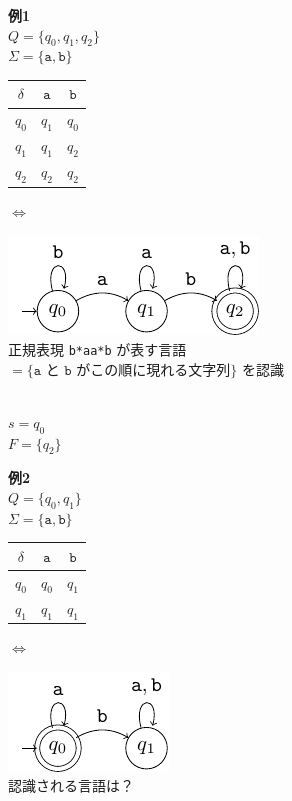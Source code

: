 \documentclass[main]{subfiles}
\begin{document}
\begin{tcolorbox}[
  enhanced,
  coltitle=black,
  attach boxed title to top left={xshift=3mm, yshift=-\tcboxedtitleheight/2},
  colback=white,
  title=DFA の例:,
  boxed title style={size=small,colframe=white,colback=white}
]
\small
\textbf{例1}\\
$Q = \{q_0, q_1, q_2\}$\\
$\Sigma = \{\mathtt{a,b}\}$\\[-14pt]
\begin{tabular}{c|cc}
$\delta$ & $\mathtt{a}$ & $\mathtt{b}$ \\
\hline
$q_0$ & $q_1$ & $q_0$ \\
$q_1$ & $q_1$ & $q_2$ \\
$q_2$ & $q_2$ & $q_2$ \\
\end{tabular}
\hspace{5mm} $\Leftrightarrow$
\begin{minipage}{0.45\textwidth}
  \includegraphics{figures/dfa1.pdf}\\[2mm]
  \small{正規表現 \texttt{b*aa*b} が表す言語\\
  $= \{\mathtt{a}\text{ と }\mathtt{b}\text{ がこの順に現れる文字列}\}$ を認識}
\end{minipage}\\[-20pt]

$s = q_0$\\
$F = \{q_2\}$

\textbf{例2}\\
$Q = \{q_0, q_1\}$\\
$\Sigma = \{\mathtt{a,b}\}$\\[-14pt]
\begin{tabular}{c|cc}
$\delta$ & $\mathtt{a}$ & $\mathtt{b}$ \\
\hline
$q_0$ & $q_0$ & $q_1$ \\
$q_1$ & $q_1$ & $q_1$ \\
\end{tabular}
\hspace{5mm} $\Leftrightarrow$ 
\begin{minipage}{0.45\textwidth}
  
  \includegraphics{figures/dfa2.pdf}\\[2mm]
  \small{認識される言語は？}
\end{minipage}\\[-20pt]


\end{tcolorbox}
\end{document}
